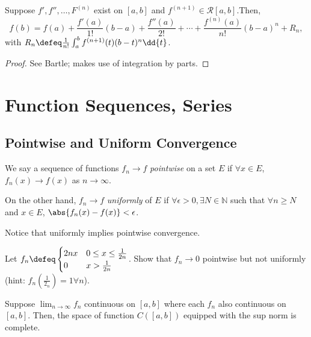 \begin{theorem}
    Suppose $f', f'', \dots, F^{(n)}$ exist on $[a, b]$ and $f^{(n+1)} \in \mathcal{R}[a, b]$.\footnotemark Then, \[
    f(b) = f(a) + \frac{f'(a)}{1!} (b - a) + \frac{f''(a)}{2!} + \cdots + \frac{f^(n)(a)}{n!} (b - a)^n + R_n,
    \]
    with $R_n \defeq \frac{1}{n!} \int_a^b f^{(n+1)}(t) (b-t)^n \dd{t}$.
\end{theorem}
\begin{proof}
    See Bartle; makes use of integration by parts.
\end{proof}


\section{Function Sequences, Series}
\subsection{Pointwise and Uniform Convergence}

\begin{definition}
    We say a sequence of functions $f_n \to f$ \emph{pointwise} on a set $E$ if $\forall x \in E$, $f_n(x) \to f(x)$ as $n \to \infty$.

    On the other hand, $f_n \to f$ \emph{uniformly} of $E$ if $\forall \epsilon > 0, \exists N \in \mathbb{N}$ such that $\forall n \geq N$ and $x \in E$, $\abs{f_n(x) - f(x)} < \epsilon$. 
\end{definition}

\begin{remark}
    Notice that uniformly implies pointwise convergence.
\end{remark}

\begin{example}
    Let $f_n \defeq \begin{cases}
        2n x & 0 \leq x \leq \frac{1}{2n}\\
        0 & x > \frac{1}{2n}
    \end{cases}$. Show that $f_n \to 0$ pointwise but not uniformly (hint: $f_n(\frac{1}{2_n}) = 1 \forall n$).
\end{example}

\begin{theorem}
    Suppose $\lim_{n \to \infty} f_n$ continuous on $[a, b]$ where each $f_n$ also continuous on $[a, b]$. Then, the space of function $C([a, b])$ equipped with the sup norm is complete.
\end{theorem}


